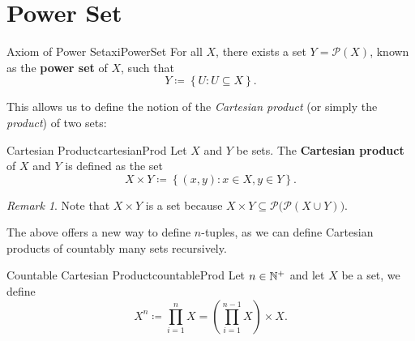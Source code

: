 \documentclass[math]{amznotes}
\theoremstyle{remark}
\newtheorem*{remark}{Remark}
\begin{document}
\section{Power Set}
\begin{axibox}{Axiom of Power Set}{axiPowerSet}
    For all $X$, there exists a set $Y = \mathcal{P}(X)$, known as the {\color{red} \textbf{power set}} of $X$, such that
    \begin{equation*}
        Y \coloneqq \left\{U \colon U \subseteq X\right\}.
    \end{equation*}
\end{axibox}
This allows us to define the notion of the \textit{Cartesian product} (or simply the \textit{product}) of two sets:
\begin{dfnbox}{Cartesian Product}{cartesianProd}
    Let $X$ and $Y$ be sets. The {\color{red} \textbf{Cartesian product}} of $X$ and $Y$ is defined as the set
    \begin{displaymath}
        X \times Y \coloneqq \left\{(x, y) \colon x \in X, y \in Y\right\}.
    \end{displaymath}
\end{dfnbox}
\begin{notebox}
    \begin{remark}
        Note that $X \times Y$ is a set because $X \times Y \subseteq \mathcal{P}\bigl(\mathcal{P}(X \cup Y)\bigr)$.
    \end{remark}
\end{notebox}
The above offers a new way to define $n$-tuples, as we can define Cartesian products of countably many sets recursively.
\begin{dfnbox}{Countable Cartesian Product}{countableProd}
    Let $n \in \mathbb{N}^+$ and let $X$ be a set, we define
    \begin{displaymath}
        X^n \coloneqq \prod_{i = 1}^n X = \left(\prod_{i = 1}^{n - 1} X\right) \times X.
    \end{displaymath}
\end{dfnbox}
\end{document}
